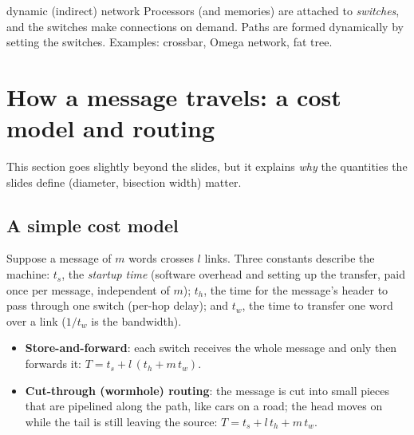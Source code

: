 \begin{definition}{dynamic (indirect) network}
Processors (and memories) are attached to \emph{switches}, and the switches make connections on demand. Paths are
formed dynamically by setting the switches. Examples: crossbar, Omega network, fat tree.
\end{definition}

\begin{center}
\end{center}

\section{How a message travels: a cost model and routing}

This section goes slightly beyond the slides, but it explains \emph{why} the quantities the slides define (diameter, bisection width) matter.

\subsection{A simple cost model}

Suppose a message of $m$ words crosses $l$ links. Three constants describe the machine:
$t_s$, the \emph{startup time} (software overhead and setting up the transfer, paid once per message, independent of $m$);
$t_h$, the time for the message's header to pass through one switch (per-hop delay);
and $t_w$, the time to transfer one word over a link ($1/t_w$ is the bandwidth).

\begin{itemize}
  \item \textbf{Store-and-forward}: each switch receives the whole message and only then forwards it:
        $T = t_s + l\,(t_h + m\,t_w)$.
  \item \textbf{Cut-through (wormhole) routing}: the message is cut into small pieces that are pipelined along the path, like cars on a road; the head
        moves on while the tail is still leaving the source: $T = t_s + l\,t_h + m\,t_w$.
\end{itemize}

